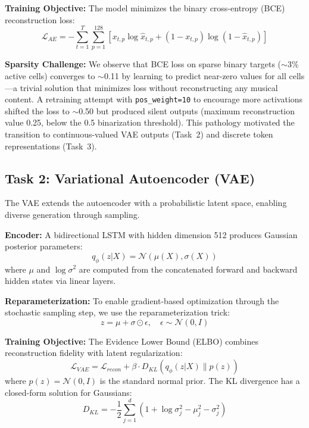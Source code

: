 \documentclass[conference]{IEEEtran}
\begin{document}
\textbf{Training Objective:} The model minimizes the binary cross-entropy (BCE) reconstruction loss:
\begin{equation}
\mathcal{L}_{AE} = -\sum_{t=1}^{T} \sum_{p=1}^{128} \left[ x_{t,p} \log \hat{x}_{t,p} + (1-x_{t,p}) \log(1-\hat{x}_{t,p}) \right]
\end{equation}

\textbf{Sparsity Challenge:} We observe that BCE loss on sparse binary targets ($\sim$3\% active cells) converges to $\sim$0.11 by learning to predict near-zero values for all cells---a trivial solution that minimizes loss without reconstructing any musical content. A retraining attempt with \texttt{pos\_weight=10} to encourage more activations shifted the loss to $\sim$0.50 but produced silent outputs (maximum reconstruction value 0.25, below the 0.5 binarization threshold). This pathology motivated the transition to continuous-valued VAE outputs (Task~2) and discrete token representations (Task~3).

\subsection{Task 2: Variational Autoencoder (VAE)}

The VAE extends the autoencoder with a probabilistic latent space, enabling diverse generation through sampling.

\textbf{Encoder:} A bidirectional LSTM with hidden dimension 512 produces Gaussian posterior parameters:
\begin{equation}
q_\phi(z|X) = \mathcal{N}(\mu(X), \sigma(X))
\end{equation}
where $\mu$ and $\log\sigma^2$ are computed from the concatenated forward and backward hidden states via linear layers.

\textbf{Reparameterization:} To enable gradient-based optimization through the stochastic sampling step, we use the reparameterization trick:
\begin{equation}
z = \mu + \sigma \odot \epsilon, \quad \epsilon \sim \mathcal{N}(0, I)
\end{equation}

\textbf{Training Objective:} The Evidence Lower Bound (ELBO) combines reconstruction fidelity with latent regularization:
\begin{equation}
\mathcal{L}_{VAE} = \mathcal{L}_{recon} + \beta \cdot D_{KL}(q_\phi(z|X) \| p(z))
\end{equation}
where $p(z) = \mathcal{N}(0, I)$ is the standard normal prior. The KL divergence has a closed-form solution for Gaussians:
\begin{equation}
D_{KL} = -\frac{1}{2} \sum_{j=1}^{d} \left(1 + \log\sigma_j^2 - \mu_j^2 - \sigma_j^2\right)
\end{equation}
\end{document}
